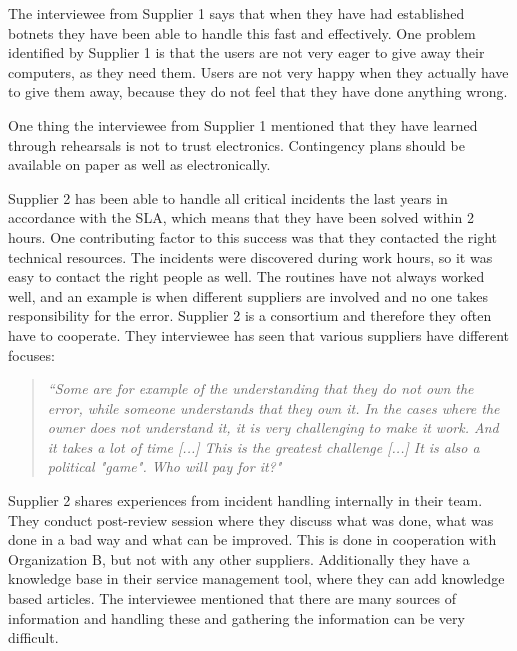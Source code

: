 The interviewee from Supplier 1 says that when they have had established botnets they have been able to handle this fast and effectively. One problem identified by Supplier 1 is that the users are not very eager to give away their computers, as they need them. Users are not very happy when they actually have to give them away, because they do not feel that they have done anything wrong.

One thing the interviewee from Supplier 1 mentioned that they have learned through rehearsals is not to trust electronics. Contingency plans should be available on paper as well as electronically.

Supplier 2 has been able to handle all critical incidents the last years in accordance with the \ac{SLA}, which means that they have been solved within 2 hours. One contributing factor to this success was that they contacted the right technical resources. The incidents were discovered during work hours, so it was easy to contact the right people as well. The routines have not always worked well, and an example is when different suppliers are involved and no one takes responsibility for the error. Supplier 2 is a consortium and therefore they often have to cooperate. They interviewee has seen that various suppliers have different focuses:

\begin{quote}
\textit{``Some are for example of the understanding that they do not own the error, while someone understands that they own it. In the cases where the owner does not understand it, it is very challenging to make it work. And it takes a lot of time [...] This is the greatest challenge [...] It is also a political "game". Who will pay for it?"}
\end{quote}

Supplier 2 shares experiences from incident handling internally in their team. They conduct post-review session where they discuss what was done, what was done in a bad way and what can be improved. This is done in cooperation with Organization B, but not with any other suppliers. Additionally they have a knowledge base in their service management tool, where they can add knowledge based articles. The interviewee mentioned that there are many sources of information and handling these and gathering the information can be very difficult.

